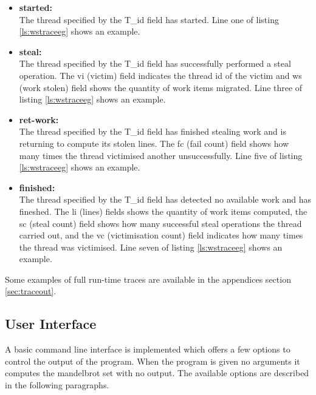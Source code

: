 \begin{itemize}
\item \textbf{started:} \\
        The thread specified by the T\_id field has started. Line one of listing \ref{ls:wstraceeg} shows an example.

\item \textbf{steal:} \\
        The thread specified by the T\_id field has successfully performed a steal
        operation. The vi (victim) field indicates the thread id of the victim and ws (work stolen) field shows
        the quantity of work items migrated. Line three of listing \ref{ls:wstraceeg} shows an example.

\item \textbf{ret-work:} \\
        The thread specified by the T\_id field has finished stealing work and is returning to compute its stolen 
        lines. The fc (fail count) field shows how many times the thread victimised another unsuccessfully. 
        Line five of listing \ref{ls:wstraceeg} shows an example.
        
\item \textbf{finished:} \\
        The thread specified by the T\_id field has detected no available work and has fineshed. The li (lines) fields shows the
        quantity of work items computed, the sc (steal count) field shows how many successful steal operations the thread carried out, 
        and the vc (victimisation count) field indicates how many times the thread was victimised.
        Line seven of listing \ref{ls:wstraceeg} shows an example.
        
\end{itemize}

Some examples of full run-time traces are available in the appendices section \ref{sec:traceout}.

\subsection{User Interface}
\label{sec:userint}

A basic command line interface is implemented which offers a few options to control the output of the program.
When the program is given no arguments it computes the mandelbrot set with no output.
The available options are described in the following paragraphs.


